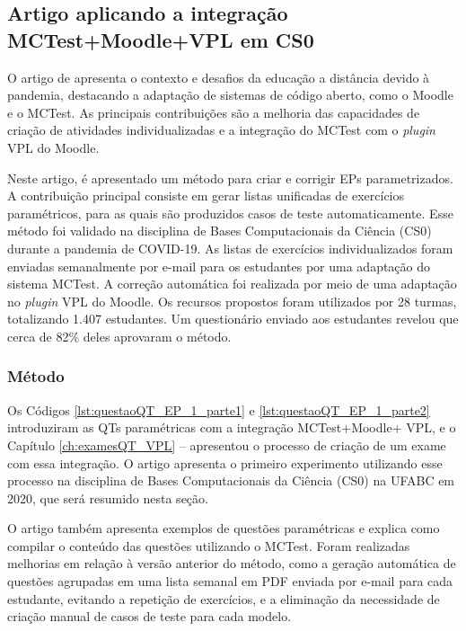 \subsection{Artigo aplicando a integração MCTest+Moodle+VPL em CS0}\label{sec:mctest_cs0_2021}

O artigo de  apresenta o contexto e desafios da educação a distância devido à pandemia, destacando a adaptação de sistemas de código aberto, como o Moodle e o MCTest. As principais contribuições são a melhoria das capacidades de criação de atividades individualizadas e a integração do MCTest com o \textit{plugin} VPL do Moodle.

Neste artigo, é apresentado um método para criar e corrigir EPs parametrizados. A contribuição principal consiste em gerar listas unificadas de exercícios paramétricos, para as quais são produzidos casos de teste automaticamente. Esse método foi validado na disciplina de Bases Computacionais da Ciência (CS0) durante a pandemia de COVID-19. As listas de exercícios individualizados foram enviadas semanalmente por e-mail para os estudantes por uma adaptação do sistema MCTest. A correção automática foi realizada por meio de uma adaptação no \textit{plugin} VPL do Moodle. Os recursos propostos foram utilizados por 28 turmas, totalizando 1.407 estudantes. Um questionário enviado aos estudantes revelou que cerca de 82\% deles aprovaram o método.

\subsubsection{Método}

Os Códigos \ref{lst:questaoQT_EP_1_parte1} e \ref{lst:questaoQT_EP_1_parte2} introduziram as QTs paramétricas com a integração  MCTest+Moodle+ VPL, e o Capítulo \ref{ch:examesQT_VPL} --  apresentou o processo de criação de um exame com essa integração. O artigo apresenta o primeiro experimento utilizando esse processo na disciplina de Bases Computacionais da Ciência (CS0) na UFABC em 2020, que será resumido nesta seção.

O artigo também apresenta exemplos de questões paramétricas e explica como compilar o conteúdo das questões utilizando o MCTest. Foram realizadas melhorias em relação à versão anterior do método, como a geração automática de questões agrupadas em uma lista semanal em PDF enviada por e-mail para cada estudante, evitando a repetição de exercícios, e a eliminação da necessidade de criação manual de casos de teste para cada modelo.

